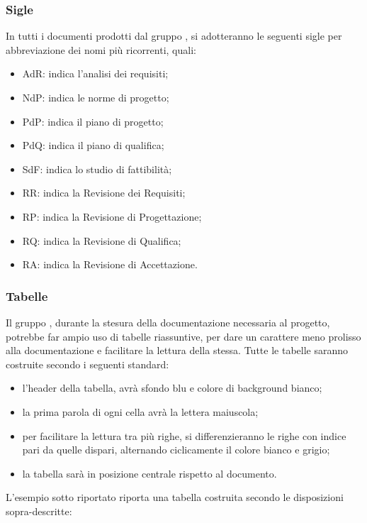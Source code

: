 \subsubsection{Sigle}
In tutti i documenti prodotti dal gruppo {\Gruppo}, si adotteranno le seguenti sigle per abbreviazione dei nomi più ricorrenti, quali:
\begin{itemize}
	\item AdR: indica l’analisi dei requisiti;
	\item NdP: indica le norme di progetto;
	\item PdP: indica il piano di progetto;
	\item PdQ: indica il piano di qualifica;
	\item SdF: indica lo studio di fattibilità;
	\item RR: indica la Revisione dei Requisiti;
	\item RP: indica la Revisione di Progettazione;
	\item RQ: indica la Revisione di Qualifica;
	\item RA: indica la Revisione di Accettazione.
\end{itemize}

\subsubsection{Tabelle}{\Gruppo}
Il gruppo {\Gruppo}, durante la stesura della documentazione necessaria al progetto, potrebbe far ampio uso di tabelle riassuntive, per dare un carattere meno prolisso alla documentazione e facilitare la lettura della stessa.
Tutte le tabelle saranno costruite secondo i seguenti standard:
\begin{itemize}
	\item l’header della tabella, avrà sfondo blu e colore di background bianco;
	\item la prima parola di ogni cella avrà la lettera maiuscola;
	\item per facilitare la lettura tra più righe, si differenzieranno le righe con indice pari da quelle dispari, alternando ciclicamente il colore bianco e grigio;
	\item la tabella sarà in posizione centrale rispetto al documento.
\end{itemize}

L’esempio sotto riportato riporta una tabella costruita secondo le disposizioni sopra-descritte:

